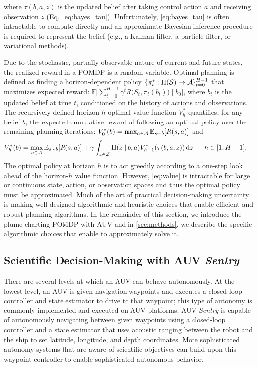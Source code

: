 where $\tau(b,a,z)$ is the updated belief after taking control action $a$ and receiving observation $z$ (Eq.~\ref{eq:bayes_tau}). Unfortunately, \cref{eq:bayes_tau} is often intractable to compute directly and an approximate Bayesian inference procedure is required to represent the belief (e.g., a Kalman filter\autocite{welch1995introduction}, a particle filter\autocite{Silver2010}, or variational methods\autocite{wainwright2002environmental,kucukelbir2017automatic}). 

Due to the stochastic, partially observable nature of current and future states, the realized reward in a POMDP is a random variable. Optimal planning is defined as finding a horizon-dependent policy $\{\pi_t^*: \Pi(\mathcal{S}) \to \mathcal{A}\}_{t=0}^{H-1}$ that maximizes expected reward: $\mathbb{E} \Big[ \sum_{t=0}^{H-1} \gamma^t R\big(S_t, \pi_t(b_t)\big) \mid b_0 \Big]$, where $b_t$ is the updated belief at time $t$, conditioned on the history of actions and observations. The recursively defined horizon-$h$ optimal value function $V^*_h$ quantifies, for any belief $b$, the expected cumulative reward of following an optimal policy over the remaining planning iterations: $V_0^{*}(b) = \operatorname*{max}_{a \in \mathcal{A}} \mathbb{E}_{s \sim b}[R(s, a)]$ and
\begin{align}
     V_h^{*}(b) &=  \max_{a \in \mathcal{A}} \mathbb{E}_{s \sim b}[R(s, a)] + \gamma \int_{z \in \mathcal{Z}} \Pi(z \mid b, a) V_{h-1}^*(\tau(b, a,z)) \, \text{d}z \hspace{0.6cm} h \in [1, H-1],
    \label{eq:value}
\end{align}
The optimal policy at horizon $h$ is to act greedily according to a one-step look ahead of the horizon-$h$ value function. However, \cref{eq:value} is intractable for large or continuous state, action, or observation spaces and thus the optimal policy must be approximated. Much of the art of practical decision-making uncertainty is making well-designed algorithmic and heuristic choices that enable efficient and robust planning algorithms. In the remainder of this section, we introduce the plume charting POMDP with AUV \Sentry and in \cref{sec:methods}, we describe the specific algorithmic choices that enable \PHORTEX to approximately solve it.  



\subsection{Scientific Decision-Making with AUV \emph{Sentry}}
There are several levels at which an AUV can behave autonomously. At the lowest level, an AUV is given navigation waypoints and executes a closed-loop controller and state estimator to drive to that waypoint; this type of autonomy is commonly implemented and executed on AUV platforms. AUV \emph{Sentry} is capable of autonomously navigating between given waypoints using a closed-loop controller and a state estimator that uses acoustic ranging between the robot and the ship to set latitude, longitude, and depth coordinates. More sophisticated autonomy systems that are aware of scientific objectives can build upon this waypoint controller to enable sophisticated autonomous behavior. 

